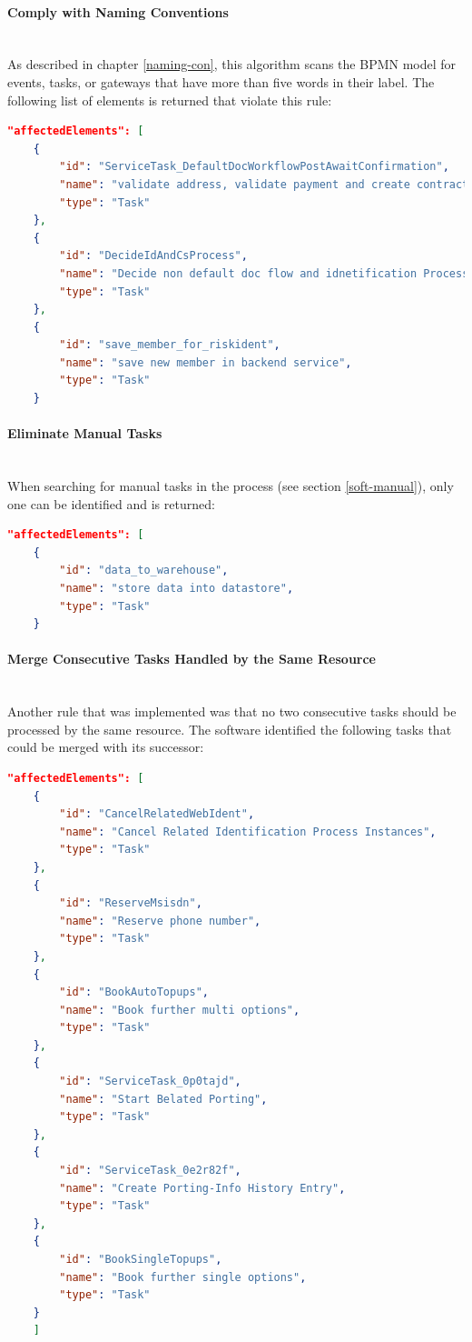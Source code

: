 \paragraph{Comply with Naming Conventions}~\\
As described in chapter \ref{naming-con}, this algorithm scans the BPMN model for events, tasks, or gateways that have more than five words in their label. The following list of elements is returned that violate this rule:
\begin{lstlisting}[language=json,label=lst:naming]
	"affectedElements": [
	{
		"id": "ServiceTask_DefaultDocWorkflowPostAwaitConfirmation",
		"name": "validate address, validate payment and create contract",
		"type": "Task"
	},
	{
		"id": "DecideIdAndCsProcess",
		"name": "Decide non default doc flow and idnetification Process",
		"type": "Task"
	},
	{
		"id": "save_member_for_riskident",
		"name": "save new member in backend service",
		"type": "Task"
	}
\end{lstlisting}


\paragraph{Eliminate Manual Tasks}~\\
When searching for manual tasks in the process (see section \ref{soft-manual}), only one can be identified and is returned:
\begin{lstlisting}[language=json,label=lst:manual]
	"affectedElements": [
	{
		"id": "data_to_warehouse",
		"name": "store data into datastore",
		"type": "Task"
	}
\end{lstlisting}
\paragraph{Merge Consecutive Tasks Handled by the Same Resource}~\\
Another rule that was implemented was that no two consecutive tasks should be processed by the same resource. The software identified the following tasks that could be merged with its successor:
\begin{lstlisting}[language=json,label=lst:merge]
	"affectedElements": [
	{
		"id": "CancelRelatedWebIdent",
		"name": "Cancel Related Identification Process Instances",
		"type": "Task"
	},
	{
		"id": "ReserveMsisdn",
		"name": "Reserve phone number",
		"type": "Task"
	},
	{
		"id": "BookAutoTopups",
		"name": "Book further multi options",
		"type": "Task"
	},
	{
		"id": "ServiceTask_0p0tajd",
		"name": "Start Belated Porting",
		"type": "Task"
	},
	{
		"id": "ServiceTask_0e2r82f",
		"name": "Create Porting-Info History Entry",
		"type": "Task"
	},
	{
		"id": "BookSingleTopups",
		"name": "Book further single options",
		"type": "Task"
	}
	]
\end{lstlisting}
